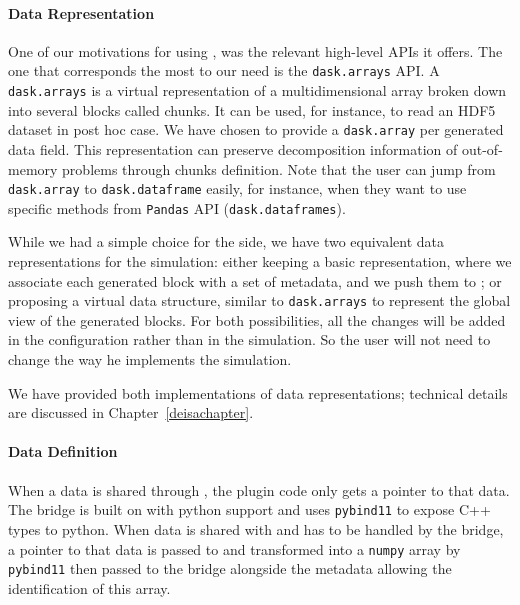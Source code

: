 \paragraph{Data Representation}\label{sec:datamodel:datarepresent}


One of our motivations for using \dask, was the relevant high-level APIs it offers. The one that corresponds the most to our need is the \texttt{dask.arrays} API. 
A \texttt{dask.arrays} is a virtual representation of a multidimensional array broken down into several blocks called chunks. It can be used, for instance, to read an HDF5 dataset in post hoc case. 
We have chosen to provide a \texttt{dask.array} per generated data field.  
This representation can preserve decomposition information of out-of-memory problems through chunks definition. 
Note that the user can jump from \texttt{dask.array} to \texttt{dask.dataframe} easily, for instance, when they want to use specific methods from \texttt{Pandas} API (\texttt{dask.dataframes}).

While we had a simple choice for the \dask side, we have two equivalent data representations for the simulation:
either keeping a basic representation, where we associate each generated block with a set of metadata, and we push them to \dask; 
or proposing a virtual data structure, similar to \texttt{dask.arrays} to represent the global view of the generated blocks.  
For both possibilities, all the changes will be added in the configuration rather than in the simulation. So the user will not need to change the way he implements the simulation. 

We have provided both implementations of data representations; technical details are discussed in Chapter~\ref{deisachapter}.

\paragraph{Data Definition}\label{sec:datamodel:datadef}

When a data is shared through \pdi, the plugin code only gets a pointer to that data.%
The bridge is built on \pdi with python support and uses \texttt{pybind11} to expose C++ types to python. 
When data is shared with \pdi and has to be handled by the bridge, a pointer to that data is passed to \pdi and transformed into a \texttt{numpy} array by \texttt{pybind11} then passed to the bridge alongside the metadata allowing the identification of this array.

